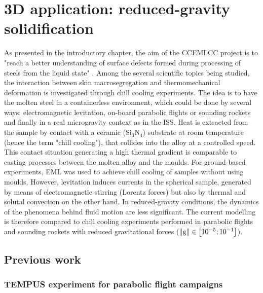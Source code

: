 \section{3D application: reduced-gravity solidification}

As presented in the introductory chapter, the aim of the CCEMLCC project is to "reach a better
understanding of surface defects formed during processing of steels from the liquid state" \citep{gandin_project_2014}.
Among the several scientific topics being studied, the interaction between skin macrosegregation 
and thermomechanical deformation is investigated through chill cooling experiments.
The idea is to have the molten steel in a containerless environment, which could be done by several ways: 
electromagnetic levitation, on-board parabolic flights or sounding rockets and finally
in a real microgravity context as in the ISS. Heat is extracted from the sample by contact with a ceramic 
(Si$_3$N$_4$) substrate at room temperature (hence the term "chill cooling"), that collides into the alloy at a controlled speed.
This contact situation generating a high thermal gradient is comparable to casting processes between the molten alloy and the moulds.
For ground-based experiments, EML was used to achieve chill cooling of samples without using moulds. 
However, levitation induces currents in the spherical sample, generated by means of electromagnetic stirring (Lorentz forces) 
but also by thermal and solutal convection on the other hand. In reduced-gravity conditions, the dynamics of the phenomena behind fluid motion are less significant.
The current modelling is therefore compared to chill cooling experiments performed in parabolic flights and sounding rockets 
with reduced gravitational forces ($\lVert \boldsymbol{\text{g}} \rVert \in \left[ 10^{-5};10^{-1} \right]$\si{\uacceleration}).


\subsection{Previous work}

\subsubsection{TEMPUS experiment for parabolic flight campaigns}

